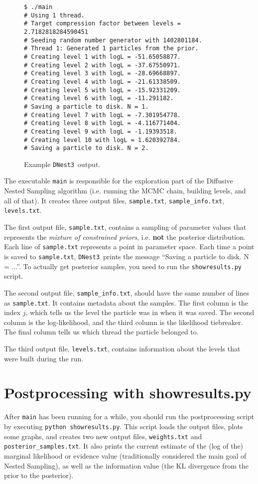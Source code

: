 \documentclass[a4paper, 11pt]{article}
\newcommand{\dnest}{{\tt DNest3}}
\begin{document}
\begin{figure}[h!]
\begin{verbatim}
$ ./main
# Using 1 thread.
# Target compression factor between levels = 2.7182818284590451
# Seeding random number generator with 1402801184.
# Thread 1: Generated 1 particles from the prior.
# Creating level 1 with logL = -51.65058877.
# Creating level 2 with logL = -37.67550971.
# Creating level 3 with logL = -28.69668897.
# Creating level 4 with logL = -21.61338509.
# Creating level 5 with logL = -15.92331209.
# Creating level 6 with logL = -11.291182.
# Saving a particle to disk. N = 1.
# Creating level 7 with logL = -7.301954778.
# Creating level 8 with logL = -4.116771404.
# Creating level 9 with logL = -1.19393518.
# Creating level 10 with logL = 1.620392784.
# Saving a particle to disk. N = 2.
\end{verbatim}
\caption{Example \dnest~output.\label{fig:output}}
\end{figure}

The executable {\tt main} is responsible for the exploration part of the
Diffusive Nested Sampling algorithm (i.e. running the MCMC chain, building
levels, and all of that). It creates three output files,
{\tt sample.txt}, {\tt sample\_info.txt}, {\tt levels.txt}.

The first output
file, {\tt sample.txt}, contains a sampling of parameter values that
represents the {\it mixture of constrained priors}, i.e. {\bf not} the
posterior distribution. Each line of {\tt sample.txt} represents a point in
parameter space. Each time a point is saved to {\tt sample.txt}, \dnest~prints
the message ``Saving a particle to disk. N = ...''. To actually get posterior
samples, you need to run the {\tt showresults.py} script.

The second output file, {\tt sample\_info.txt}, should have the same number of
lines as {\tt sample.txt}. It contains metadata about the samples. The first
column is the index $j$, which tells us the level the particle was in when it
was saved. The second column is the log-likelihood, and the third column is
the likelihood tiebreaker. The final column tells us which thread the particle
belonged to.

The third output file, {\tt levels.txt}, contains information about the levels
that were built during the run.

\section{Postprocessing with showresults.py}
After {\tt main} has been running for
a while, you should run the postprocessing script
by executing {\tt python showresults.py}. This script loads the output files,
plots some graphs, and creates two new output files, {\tt weights.txt} and
{\tt posterior\_samples.txt}. It also prints the current estimate of the
(log of the) marginal likelihood or evidence value (traditionally considered
the main goal of Nested Sampling), as well as the information value (the KL
divergence from the prior to the posterior).
\end{document}

